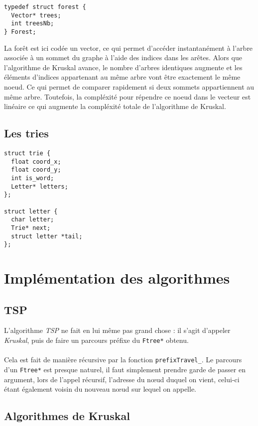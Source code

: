 \documentclass[a4paper]{article}
\begin{document}
\begin{verbatim}
typedef struct forest {
  Vector* trees;
  int treesNb;
} Forest;
\end{verbatim}

La forêt est ici codée un vector, ce qui permet d'accéder instantanément à l'arbre associée à un sommet du graphe à l'aide des indices dans les arêtes. Alors que l'algorithme de Kruskal avance, le nombre d'arbres identiques augmente et les éléments d'indices appartenant au même arbre vont être exactement le même noeud. Ce qui permet de comparer rapidement si deux sommets appartiennent au même arbre. Toutefois, la compléxité pour répendre ce noeud dans le vecteur est linéaire ce qui augmente la compléxité totale de l'algorithme de Kruskal.

\subsection{Les tries}

\begin{verbatim}
struct trie {
  float coord_x;
  float coord_y;
  int is_word;
  Letter* letters;
};

struct letter {
  char letter;
  Trie* next;
  struct letter *tail;
};
\end{verbatim}

\section{Implémentation des algorithmes}

\subsection{TSP}
L'algorithme \emph{TSP} ne fait en lui même pas grand chose : il s'agit d'appeler \emph{Kruskal}, puis de faire un parcours préfixe du \texttt{Ftree*} obtenu.

\paragraph*{}
Cela est fait de manière récursive par la fonction \texttt{prefixTravel\_}. Le parcours d'un \texttt{Ftree*} est presque naturel, il faut simplement prendre garde de passer en argument, lors de l'appel récursif, l'adresse du nœud duquel on vient, celui-ci étant également voisin du nouveau nœud sur lequel on appelle.
\subsection{Algorithmes de Kruskal}
\end{document}
